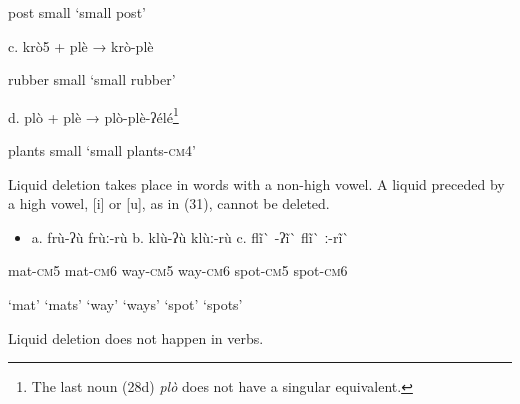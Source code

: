 \begin{styleindexi}
                post                  small                                  ‘small post’                        
\end{styleindexi}

\begin{styleindexi}
            c.  krò5           +      plè                        →          krò-plè             
\end{styleindexi}

\begin{styleindexi}
                rubber              small                                  ‘small rubber’      
\end{styleindexi}

\begin{styleindexi}
            d.  plò            +      plè                         →          plò-plè-ʔélé\footnote{The last noun (28d) \textit{plò} does not have a singular equivalent.}       
\end{styleindexi}

\begin{styleindexi}
                plants               small                                  ‘small plants-\textsc{cm}4’ 
\end{styleindexi}

Liquid deletion takes place in words with a non-high vowel. A liquid preceded by a high vowel, [i] or [u], as in (31), cannot be deleted. 

\begin{itemize}
\item \begin{styleindexi}
   \label{bkm:Ref500059376}a. frù-ʔù         frùː-rù           b.  klù-ʔù          klùː-rù            c.   flĩ\`{} -ʔĩ\`{}             flĩ\`{} ː-rĩ\`{}   
\end{styleindexi}\end{itemize}
\begin{styleindexi}
              mat-\textsc{cm}5    mat-\textsc{cm}6           way-\textsc{cm}5      way-\textsc{cm}6             spot-\textsc{cm}5      spot-\textsc{cm}6
\end{styleindexi}

\begin{styleindexi}
              ‘mat’          ‘mats’              ‘way’            ‘ways’                ‘spot’            ‘spots’
\end{styleindexi}

Liquid deletion does not happen in verbs.

